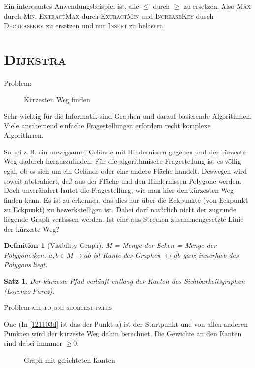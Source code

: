 \documentclass[ngerman,draft,parskip=half*,twoside]{scrreprt}
\theoremstyle{break}
\newtheorem{satz}{Satz}[chapter]
\newtheorem{definition}{Definition}[chapter]
\theoremstyle{nonumberbreak}
\begin{document}
Ein interesantes Anwendungsbeispiel ist, alle $\leq$ durch $\geq$ zu ersetzen. Also \textsc{Max} durch \textsc{Min},
\textsc{ExtractMax} durch \textsc{ExtractMin} und \textsc{IncreaseKey} durch \textsc{Decreasekey} zu ersetzen und nur \textsc{Insert}
zu belassen.

\section{\textsc{Dijkstra}}

 Problem:
\begin{figure}[H]
  \centering
  \caption{Kürzesten Weg finden}
  \label{121103c}
\end{figure}

Sehr wichtig für die Informatik sind Graphen und darauf basierende Algorithmen. Viele anscheinend einfache Fragestellungen erfordern
recht komplexe Algorithmen.

So sei z.\,B. ein unwegsames Gelände mit Hindernissen gegeben und der kürzeste Weg dadurch herauszufinden. Für die algorithmische
Fragestellung ist es völlig egal, ob es sich um ein Gelände oder eine andere Fläche handelt. Deswegen wird soweit abstrahiert, daß
aus der Fläche und den Hindernissen Polygone werden. Doch unverändert lautet die Fragestellung, wie man hier den kürzesten Weg
finden kann. Es ist zu erkennen, das dies nur über die Eckpunkte (von Eckpunkt zu Eckpunkt)
zu bewerkstelligen ist. Dabei darf natürlich nicht der zugrunde liegende Graph verlassen werden. Ist eine aus Strecken zusammengesetzte
Linie der kürzeste Weg?

\begin{definition}[Visibility Graph]
M = Menge der Ecken = Menge der Polygonecken.
$a, b \in M \rightarrow \overline{ab}$ ist Kante des Graphen $\leftrightarrow \overline{ab}$ ganz innerhalb des Polygons liegt.
\end{definition}

\begin{satz}
Der kürzeste Pfad verläuft entlang der Kanten des Sichtbarkeitsgraphen (Lorenzo-Parez).
\end{satz}
Problem \textsc{all-to-one shortest paths}

One (In \autoref{121103d} ist das der Punkt a) ist der Startpunkt und von allen anderen
Punkten wird der kürzeste Weg dahin berechnet.
Die Gewichte an den Kanten sind dabei immmer $\geq 0$.

\begin{figure}[ht]
  \centering
  \caption{Graph mit gerichteten Kanten}
  \label{121103d}
\end{figure}
\end{document}
